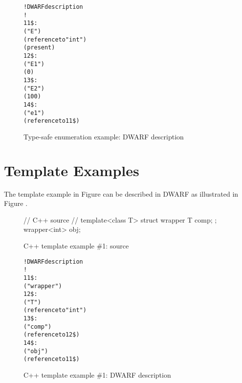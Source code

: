 \begin{figure}[ht]
\begin{dwflisting}
\begin{alltt}
! DWARF description
!
11\$:  \DWTAGenumerationtype
          \DWATname("E")
          \DWATtype(reference to "int")
          \DWATenumclass(present)
12\$:      \DWTAGenumerator
              \DWATname("E1")
              \DWATconstvalue(0)
13\$:      \DWTAGenumerator
              \DWATname("E2")
              \DWATconstvalue(100)
14\$:  \DWTAGvariable
          \DWATname("e1")
          \DWATtype(reference to 11\$)
\end{alltt}
\end{dwflisting}
\caption{Type-safe enumeration example: DWARF description}
\label{fig:ctypesafeenumerationexampledwarf}
\end{figure}


\clearpage
\section{Template Examples}
\label{app:templateexample}

The  template example in
Figure 
can be described in DWARF as illustrated in 
Figure .

\begin{figure}[ht]
\begin{nlnlisting}
// C++ source
//
template<class T>
struct wrapper {
    T comp;
};
wrapper<int> obj;
\end{nlnlisting}
\caption{C++ template example \#1: source}
\label{fig:ctemplateexample1source}
\end{figure}

\begin{figure}[ht]
\begin{dwflisting}
\begin{alltt}
! DWARF description
!
11\$:  \DWTAGstructuretype
          \DWATname("wrapper")
12\$:      \DWTAGtemplatetypeparameter
              \DWATname("T")
              \DWATtype(reference to "int")
13\$:      \DWTAGmember
              \DWATname("comp")
              \DWATtype(reference to 12\$)
14\$:  \DWTAGvariable
          \DWATname("obj")
          \DWATtype(reference to 11\$)
\end{alltt}
\end{dwflisting}
\caption{C++ template example \#1: DWARF description}
\label{fig:ctemplateexample1dwarf}
\end{figure}

